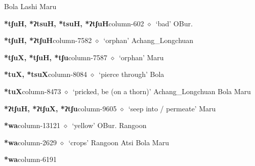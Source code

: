          Bola 
\hspace{1ex}
         Lashi 
\hspace{1ex}
         Maru 
  \item {\footnotesize \textbf{*tʃuH, *ʔtsuH, *tsuH, *ʔtʃuH}}{\tiny column-602}
         $\diamond$~`bad'
         OBur. 
  \item {\footnotesize \textbf{*tʃuH, *ʔtʃuH}}{\tiny column-7582}
         $\diamond$~`orphan'
         Achang\_Longchuan 
  \item {\footnotesize \textbf{*tʃuX, *tʃuH, *tʃu}}{\tiny column-7587}
         $\diamond$~`orphan'
         Maru 
  \item {\footnotesize \textbf{*tuX, *tsuX}}{\tiny column-8084}
         $\diamond$~`pierce through'
         Bola 
  \item {\footnotesize \textbf{*tuX}}{\tiny column-8473}
         $\diamond$~`pricked, be (on a thorn)'
         Achang\_Longchuan 
\hspace{1ex}
         Bola 
\hspace{1ex}
         Maru 
  \item {\footnotesize \textbf{*ʔtʃuH, *ʔtʃuX, *ʔtʃu}}{\tiny column-9605}
         $\diamond$~`seep into / permeate'
         Maru 
  \item {\footnotesize \textbf{*wa}}{\tiny column-13121}
         $\diamond$~`yellow'
         OBur. 
\hspace{1ex}
         Rangoon 
  \item {\footnotesize \textbf{*wa}}{\tiny column-2629}
         $\diamond$~`crops'
         Rangoon 
\hspace{1ex}
         Atsi 
\hspace{1ex}
         Bola 
\hspace{1ex}
         Maru 
  \item {\footnotesize \textbf{*wa}}{\tiny column-6191}

